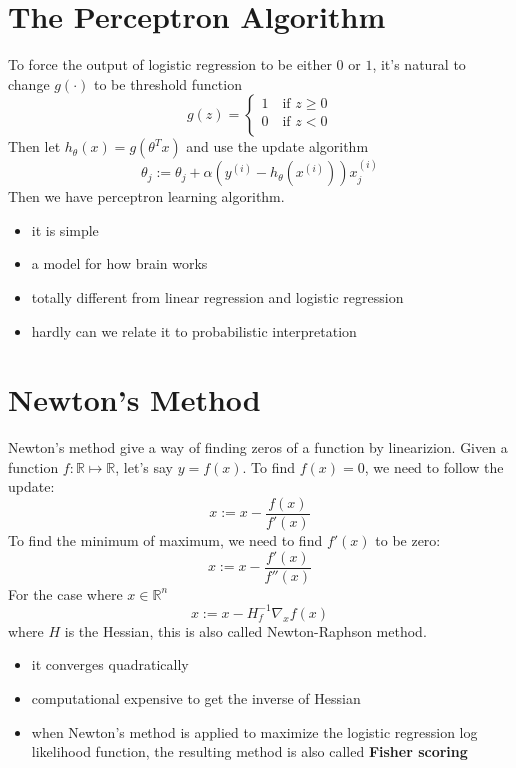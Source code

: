 \documentclass[10pt,a4paper,oneside]{article}
\begin{document}
\section{The Perceptron  Algorithm}
To force the output of logistic regression to be either $0$ or $1$, it's natural to change $g(\cdot)$ to be threshold function
\begin{equation*}
g(z) = \left\{
\begin{array}{lr}
1 \quad \text{if } z \geq 0\\
0 \quad \text{if } z < 0\\
\end{array}
\right.
\end{equation*}
Then let $h_\theta(x)= g(\theta^T x)$ and use the update algorithm
\[
\theta_j := \theta_j + \alpha(y^{(i)}- h_\theta(x^{(i)}))x_j^{(i)}
\]
Then we have perceptron learning algorithm.
\begin{itemize}
	\item it is simple
	\item a model for how brain works
	\item totally different from linear regression and logistic regression
	\item hardly can we relate it to probabilistic interpretation 
\end{itemize}

\section{Newton's Method}
Newton's method give a way of finding zeros of a function by linearizion. Given a function $f: \mathbb{R} \mapsto \mathbb{R}$, let's say $y = f(x)$. To find $f(x)=0$, we need to follow the update:
\[
x := x - \frac{f(x)}{f'(x)}
\]
To find the minimum of maximum, we need to find $f'(x)$ to be zero:
\[
x := x - \frac{f'(x)}{f''(x)}
\]
For the case where $x \in \mathbb{R}^n$
\[
x := x- H_f^{-1} \nabla_x f(x)
\]
where $H$ is the Hessian, this is also called Newton-Raphson method.
\begin{itemize}
	\item it converges quadratically
	\item computational expensive to get the inverse of Hessian
	\item when Newton's method is applied to maximize the logistic regression log likelihood function, the resulting method is also called \textbf{Fisher scoring}
\end{itemize}
\end{document}
